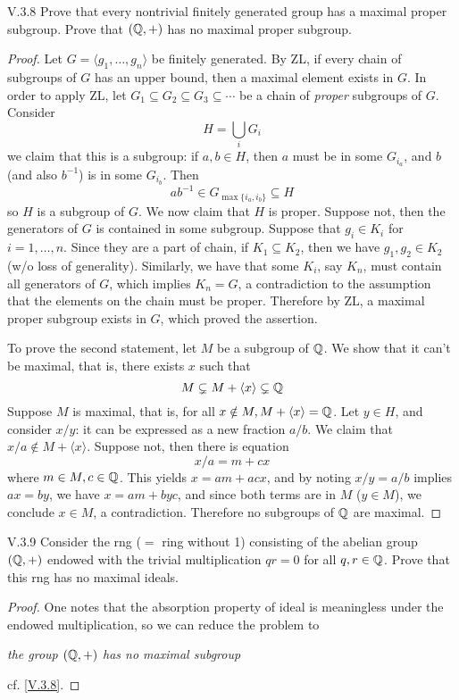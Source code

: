 \begin{problem}{V.3.8}
Prove that every nontrivial finitely generated group has a maximal proper subgroup. Prove that $(\mathbb{Q},+)$ has no maximal proper subgroup.
\end{problem}
\begin{proof}
Let $G = \langle g_1,\dotsc,g_n \rangle$ be finitely generated. By ZL, if every chain of subgroups of $G$ has an upper bound, then a maximal element exists in $G$. In order to apply ZL, let $G_1 \subseteq G_2 \subseteq G_3 \subseteq \cdots$ be a chain of \emph{proper} subgroups of $G$. Consider
\[
H = \bigcup_{i}G_i
\]
we claim that this is a subgroup: if $a,b \in H$, then $a$ must be in some $G_{i_a}$, and $b$ (and also $b^{-1}$) is in some $G_{i_b}$. Then
\[
ab^{-1} \in G_{\max\{i_a,i_b\}} \subseteq H
\]
so $H$ is a subgroup of $G$. We now claim that $H$ is proper. Suppose not, then the generators of $G$ is contained in some subgroup. Suppose that $g_i \in K_i$ for $i = 1,\dotsc,n$. Since they are a part of chain, if $K_1 \subseteq K_2$, then we have $g_1,g_2 \in K_2$(w/o loss of generality). Similarly, we have that some $K_i$, say $K_n$, must contain all generators of $G$, which implies $K_n = G$, a contradiction to the assumption that the elements on the chain must be proper. Therefore by ZL, a maximal proper subgroup exists in $G$, which proved the assertion.

To prove the second statement, let $M$ be a subgroup of $\mathbb{Q}$. We show that it can't be maximal, that is, there exists $x$ such that 
\[
M \subsetneq M + \langle x \rangle \subsetneq \mathbb{Q}
\]
Suppose $M$ is maximal, that is, for all $x \notin M, M+ \langle x \rangle = \mathbb{Q}$. Let $y \in H$, and consider $x/y$: it can be expressed as a new fraction $a/b$. We claim that $x/a \notin M+ \langle x \rangle$. Suppose not, then there is equation
\[
x/a = m + cx
\]
where $m \in M, c \in \mathbb{Q}$. This yields $x = am + acx$, and by noting $x/y = a/b$ implies $ax = by$, we have $x = am+byc$, and since both terms are in $M$ ($y \in M$), we conclude $x \in M$, a contradiction. Therefore no subgroups of $\mathbb{Q}$ are maximal.
\end{proof}

\begin{problem}{V.3.9}
Consider the rng ($=$ ring without 1) consisting of the abelian group $(\mathbb{Q},+)$ endowed with the trivial multiplication $qr=0$ for all $q,r \in \mathbb{Q}$. Prove that this rng has no maximal ideals.
\end{problem}
\begin{proof}
One notes that the absorption property of ideal is meaningless under the endowed multiplication, so we can reduce the problem to
\begin{center}
\emph{the group $(\mathbb{Q},+)$ has no maximal subgroup}
\end{center}
cf. \ref{V.3.8}.

\end{proof}

